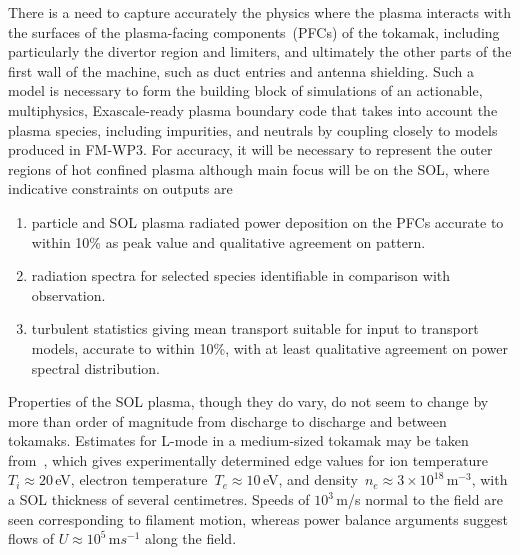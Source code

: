 There is a need to capture accurately the physics where the plasma interacts 
with the surfaces of the plasma-facing components~(PFCs) of the tokamak,
including particularly the divertor region 
and limiters, and ultimately the other parts of the first wall of the machine, 
such as duct entries and antenna shielding. Such a model is necessary to form 
the building block of simulations of an actionable, multiphysics,
Exascale-ready plasma boundary code that takes into account the plasma species, 
including impurities, and neutrals by coupling closely to models produced in FM-WP3.
For accuracy, it will be necessary to represent the outer regions of hot confined plasma
although main focus will be on the SOL, where indicative constraints on outputs are
\begin{enumerate}
\item particle and SOL plasma radiated power deposition on the PFCs
accurate to within 10\% as peak value and qualitative agreement on pattern.
\item radiation spectra for selected species identifiable in comparison with 
observation.
\item turbulent statistics giving mean transport suitable for input to transport
models, accurate to within 10\%, with at least qualitative agreement on power spectral
distribution.
\end{enumerate}

Properties of the SOL plasma, though they do vary, do not seem to change by more than
order of magnitude from discharge to discharge and between tokamaks. 
Estimates for L-mode in a medium-sized tokamak may be taken from~\cite{Mi13Expe}, 
which gives experimentally determined
edge values for ion temperature~$T_i\approx20$\,eV, electron temperature~$T_e\approx10$\,eV,
and density~$n_e\approx 3\times10^{18}$\,m$^{-3}$, with a SOL thickness
of several centimetres. Speeds of $10^3$\,m/s normal to the field
are seen corresponding to filament motion, whereas power balance arguments
suggest flows of $U \approx 10^5$\,m$s^{-1}$ along the field.

